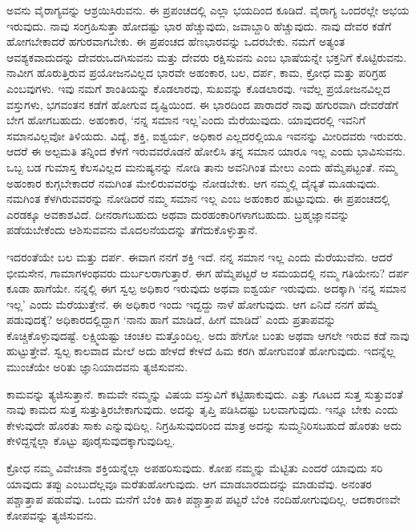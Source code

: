 ಅವನು ವೈರಾಗ್ಯವನ್ನು ಆಶ್ರಯಿಸಿರುವನು. ಈ ಪ್ರಪಂಚದಲ್ಲಿ ಎಲ್ಲಾ ಭಯದಿಂದ ಕೂಡಿದೆ. ವೈರಾಗ್ಯ ಒಂದರಲ್ಲೇ ಅಭಯ ಇರುವುದು. ನಾವು ಸಂಗ್ರಹಿಸುತ್ತಾ ಹೋದಷ್ಟು ಭಾರ ಹೆಚ್ಚುವುದು, ಜವಾಬ್ದಾರಿ ಹೆಚ್ಚುವುದು. ನಾವು ದೇವರ ಕಡೆಗೆ ಹೋಗಬೇಕಾದರೆ ಹಗುರವಾಗಬೇಕು. ಈ ಪ್ರಪಂಚದ ಹೆಣಭಾರವನ್ನು ಒದರಬೇಕು. ನಮಗೆ ಅತ್ಯಂತ ಆವಶ್ಯಕವಾದುದನ್ನು ದೇವರು\break ಒದಗಿಸುವನು ಮತ್ತು ದೇವರು ರಕ್ಷಿಸುವನು ಎಂಬ ಭಾಷೆಯನ್ನೇ ಭಕ್ತನಿಗೆ ಕೊಟ್ಟಿರುವನು. ನಾವೀಗ ಹೊರುತ್ತಿರುವ ಪ್ರಯೋಜನವಿಲ್ಲದ ಭಾರವೇ ಅಹಂಕಾರ, ಬಲ, ದರ್ಪ, ಕಾಮ, ಕ್ರೋಧ ಮತ್ತು ಪರಿಗ್ರಹ ಎಂಬವುಗಳು. ಇವು ನಮಗೆ ಶಾಂತಿಯನ್ನು ಕೊಡಲಾರವು, ಸುಖವನ್ನು ಕೊಡಲಾರವು. ಇವೆಲ್ಲ ಪ್ರಯೋಜನವಿಲ್ಲದ ವಸ್ತುಗಳು, ಭಗವಂತನ ಕಡೆಗೆ ಹೋಗುವ ದೃಷ್ಟಿಯಿಂದ. ಈ ಭಾರದಿಂದ ಪಾರಾದರೆ ನಾವು ಹಗುರವಾಗಿ ದೇವರೆಡೆಗೆ ಬೇಗ ಹೋಗಬಹುದು. ಅಹಂಕಾರ, ‘ನನ್ನ ಸಮಾನ ಇಲ್ಲ’ಎಂದು ಮೆರೆಯುವುದು. ಯಾವುದರಲ್ಲಿ ಇವನಿಗೆ ಸಮಾನವಿಲ್ಲವೋ ತಿಳಿಯದು. ವಿದ್ಯೆ, ಶಕ್ತಿ, ಐಶ್ವರ್ಯ, ಅಧಿಕಾರ ಎಲ್ಲದರಲ್ಲಿಯೂ ಇವನನ್ನು ಮೀರಿದವರು ಇರುವರು. ಆದರೆ ಈ ಅಲ್ಪಮತಿ ತನ್ನಿಂದ ಕೆಳಗೆ ಇರುವವರೊಡನೆ ಹೋಲಿಸಿ ತನ್ನ ಸಮಾನ ಯಾರೂ ಇಲ್ಲ ಎಂದು ಭಾವಿಸುವನು. ಒಬ್ಬ ಬಡ ಗುಮಾಸ್ತ ಕೆಲಸವಿಲ್ಲದ ಮನುಷ್ಯನನ್ನು ನೋಡಿ ತಾನು ಅವನಿಗಿಂತ ಮೇಲು ಎಂದು ಹೆಮ್ಮೆಪಟ್ಟಂತೆ. ನಮ್ಮ ಅಹಂಕಾರ ಕುಗ್ಗಬೇಕಾದರೆ ನಮಗಿಂತ ಮೇಲಿರುವವರನ್ನು ನೋಡಬೇಕು. ಆಗ ನಮ್ಮಲ್ಲಿ ದೈನ್ಯತೆ ಮೂಡುವುದು. ನಮಗಿಂತ ಕೆಳಗಿರುವವರನ್ನು ನೋಡಿದರೆ ನಮ್ಮ ಸಮಾನ ಇಲ್ಲ ಎಂಬ ಅಹಂಕಾರ ಹುಟ್ಟುವುದು. ಈ ಪ್ರಪಂಚದಲ್ಲಿ ಎರಡಕ್ಕೂ ಅವಕಾಶವಿದೆ. ದೀನರಾಗಬಹುದು ಅಥವಾ ದುರಹಂಕಾರಿಗಳಾಗಬಹುದು. ಬ್ರಹ್ಮಜ್ಞಾನವನ್ನು ಪಡೆಯಬೇಕೆಂದು ಆಶಿಸುವವನು ಮೊದಲನೆಯದನ್ನು ತೆಗೆದುಕೊಳ್ಳುತ್ತಾನೆ.

ಇದರಂತೆಯೇ ಬಲ ಮತ್ತು ದರ್ಪ. ಈವಾಗ ನನಗೆ ಶಕ್ತಿ ಇದೆ. ನನ್ನ ಸಮಾನ ಇಲ್ಲ ಎಂದು ಮೆರೆಯುವೆನು. ಆದರೆ ಭೀಮಸೇನ, ಗಾಮಾಗಳಂಥವರು ದುರ್ಬಲರಾಗುತ್ತಾರೆ. ಈಗ ಹೆಮ್ಮೆಪಟ್ಟರೆ ಆ ಸಮಯದಲ್ಲಿ ನಮ್ಮ ಗತಿಯೇನು? ದರ್ಪ ಕೂಡಾ ಹಾಗೆಯೇ. ನನ್ನಲ್ಲಿ ಈಗ ಸ್ವಲ್ಪ ಅಧಿಕಾರ ಇರುವುದು ಅಥವಾ ಐಶ್ವರ್ಯ ಇರುವುದು. ಅದಕ್ಕಾಗಿ ‘ನನ್ನ ಸಮಾನ ಇಲ್ಲ’ ಎಂದು ಮೆರೆಯುತ್ತೇನೆ. ಈ ಅಧಿಕಾರ ಇಂದು ಇದ್ದದ್ದು ನಾಳೆ ಹೋಗುವುದು. ಆಗ ಏನಿದೆ ನನಗೆ ಹೆಮ್ಮೆ ಪಡುವುದಕ್ಕೆ? ಅಧಿಕಾರದಲ್ಲಿದ್ದಾಗ ‘ನಾನು ಹಾಗೆ ಮಾಡಿದೆ, ಹೀಗೆ ಮಾಡಿದೆ’ ಎಂದು ಪ್ರತಾಪವನ್ನು ಕೊಚ್ಚಿಕೊಳ್ಳುವುದಷ್ಟೆ. ಲಕ್ಷ್ಮಿಯಷ್ಟು ಚಂಚಲ ಮತ್ತೊಂದಿಲ್ಲ. ಅದು ಹೇಗೋ ಬಂತು ಅಥವಾ ಆಗಲೇ ಇರುವ ಕಡೆ ನಾವು ಹುಟ್ಟುತ್ತೇವೆ. ಸ್ವಲ್ಪ ಕಾಲವಾದ ಮೇಲೆ ಅದು ಹೇಳದೆ ಕೇಳದೆ ಹಿಮ ಕರಗಿ ಹೋಗುವಂತೆ ಹೋಗುವುದು. ಇದನ್ನೆಲ್ಲ ಮುಂಚೆಯೇ ಅರಿತು ಜ್ಞಾನಿಯಾದವನು ತ್ಯಜಿಸುವನು.

ಕಾಮವನ್ನು ತ್ಯಜಿಸುತ್ತಾನೆ. ಕಾಮವೇ ನಮ್ಮನ್ನು ವಿಷಯ ವಸ್ತುವಿಗೆ ಕಟ್ಟಿಹಾಕುವುದು. ಎತ್ತು ಗೂಟದ ಸುತ್ತ ಸುತ್ತುವಂತೆ ನಾವು ಕಾಮದ ಸುತ್ತ ಸುತ್ತುತ್ತಿರಬೇಕಾಗುವುದು. ಅದನ್ನು ತೃಪ್ತಿ ಪಡಿಸಿದಷ್ಟು ಬಲವಾಗುವುದು. ಇನ್ನೂ ಬೇಕು ಎಂದು ಕೇಳುವುದೇ ಹೊರತು ಸಾಕು ಎನ್ನುವುದಿಲ್ಲ. ನಿಗ್ರಹಿಸುವುದರಿಂದ ಮಾತ್ರ ಅದನ್ನು ಸುಮ್ಮನಿರಿಸಬಹುದೆ ಹೊರತು ಅದು ಕೇಳಿದ್ದನ್ನೆಲ್ಲಾ ಕೊಟ್ಟು ಪೂರೈಸುವುದಕ್ಕಾಗುವುದಿಲ್ಲ.

ಕ್ರೋಧ ನಮ್ಮ ವಿವೇಚನಾ ಶಕ್ತಿಯನ್ನೆಲ್ಲಾ ಅಪಹರಿಸುವುದು. ಕೋಪ ನಮ್ಮನ್ನು ಮೆಟ್ಟಿತು ಎಂದರೆ ಯಾವುದು ಸರಿ ಯಾವುದು ತಪ್ಪು ಎಂಬುದೆಲ್ಲವೂ ಮರೆತುಹೋಗುವುದು. ಆಗ ಮಾಡಬಾರದುದನ್ನು ಮಾಡುವೆವು. ಅನಂತರ ಪಶ್ಚಾತ್ತಾಪ ಪಡುವೆವು. ಒಂದು ಮನೆಗೆ ಬೆಂಕಿ ಹಾಕಿ ಪಶ್ಚಾತ್ತಾಪ ಪಟ್ಟರೆ ಬೆಂಕಿ ನಂದಿಹೋಗುವುದಿಲ್ಲ. ಆದಕಾರಣವೇ ಕೋಪವನ್ನು ತ್ಯಜಿಸುವನು.


